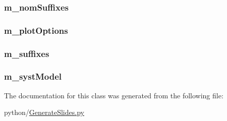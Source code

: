 \hypertarget{classGenerateSlides_1_1Systematic_ae35e5f4237bf3f3454becacd68dd52a3}{
\subsubsection[{m\+\_\+nom\+Suffixes}]{\setlength{\rightskip}{0pt plus 5cm}m\+\_\+nom\+Suffixes}}\label{classGenerateSlides_1_1Systematic_ae35e5f4237bf3f3454becacd68dd52a3}
\hypertarget{classGenerateSlides_1_1Systematic_a12151d8968fdc5ecec86f072aa806830}{
\subsubsection[{m\+\_\+plot\+Options}]{\setlength{\rightskip}{0pt plus 5cm}m\+\_\+plot\+Options}}\label{classGenerateSlides_1_1Systematic_a12151d8968fdc5ecec86f072aa806830}
\hypertarget{classGenerateSlides_1_1Systematic_a04a6068d792d01a60ada8f685fe98a59}{
\subsubsection[{m\+\_\+suffixes}]{\setlength{\rightskip}{0pt plus 5cm}m\+\_\+suffixes}}\label{classGenerateSlides_1_1Systematic_a04a6068d792d01a60ada8f685fe98a59}
\hypertarget{classGenerateSlides_1_1Systematic_aa74f8b84fd3137181a810a20db65bf52}{
\subsubsection[{m\+\_\+syst\+Model}]{\setlength{\rightskip}{0pt plus 5cm}m\+\_\+syst\+Model}}\label{classGenerateSlides_1_1Systematic_aa74f8b84fd3137181a810a20db65bf52}


The documentation for this class was generated from the following file\+:\begin{DoxyCompactItemize}
\item 
python/\hyperlink{GenerateSlides_8py}{Generate\+Slides.\+py}\end{DoxyCompactItemize}
